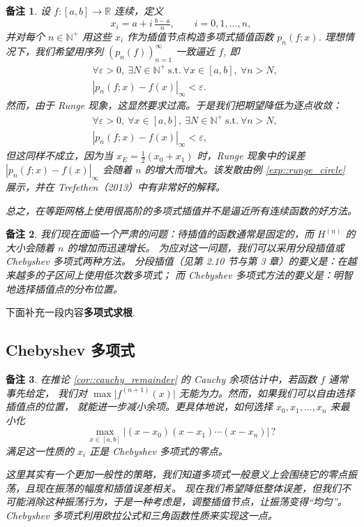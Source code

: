 \documentclass[a4paper]{ctexart}
\newtheorem{remark}{备注}
\numberwithin{theorem}{section}
\numberwithin{equation}{section}
\numberwithin{figure}{section}
\numberwithin{remark}{section}
\begin{document}
\begin{remark}
设 $f:[a,b]\to\mathbb{R}$ 连续，定义
\begin{equation*}
x_i=a+i\,\tfrac{b-a}{n},\qquad i=0,1,\ldots,n,
\end{equation*}
并对每个 $n\in\mathbb{N}^+$ 用这些 $x_i$ 作为插值节点构造多项式插值函数 $p_n(f;x)$. 
理想情况下，我们希望用序列 $(p_n(f))_{n=1}^{\infty}$ 一致逼近 $f$, 即
\begin{align*}
&\forall \varepsilon>0,\ \exists N\in\mathbb{N}^+\ \text{s.t.}\ \forall x\in[a,b],\ \forall n>N, \\
&| p_n(f;x)-f(x) |_{\infty}<\varepsilon.
\end{align*}
然而，由于 Runge 现象，这显然要求过高。于是我们把期望降低为逐点收敛：
\begin{align*}
&\forall \varepsilon>0,\ \forall x\in[a,b],\ \exists N\in\mathbb{N}^+\ \text{s.t.}\ \forall n>N, \\
& |p_n(f;x)-f(x)|_{\infty}<\varepsilon,
\end{align*}
但这同样不成立，因为当 $x_E=\tfrac{1}{2}(x_0+x_1)$ 时，Runge 现象中的误差 $| p_n(f;x)-f(x)|_{\infty} $ 
会随着 $n$ 的增大而增大。该发散由例 \ref{exp::runge_circle} 展示，并在 Trefethen（2013）中有非常好的解释。

总之，在等距网格上使用很高阶的多项式插值并不是逼近所有连续函数的好方法。
\end{remark}

\begin{remark}
我们现在面临一个严肃的问题：待插值的函数通常是固定的，而 $H^{(n)}$ 的大小会随着 $n$ 的增加而迅速增长。
为应对这一问题，我们可以采用分段插值或 Chebyshev 多项式两种方法。
分段插值（见第 2.10 节与第 3 章）的要义是：在越来越多的子区间上使用低次数多项式；
而 Chebyshev 多项式方法的要义是：明智地选择插值点的分布位置。
\end{remark}

下面补充一段内容\textbf{多项式求根}.


\subsection{Chebyshev 多项式}

\begin{remark}
在推论 \ref{cor::cauchy_remainder} 的 Cauchy 余项估计中，若函数 $f$ 通常事先给定，
我们对 $\max\lvert f^{(n+1)}(x)\rvert$ 无能为力。然而，如果我们可以自由选择插值点的位置，
就能进一步减小余项。更具体地说，如何选择 $x_0,x_1,\ldots,x_n$ 来最小化
\begin{equation*}
\max_{x\in[a,b]} \bigl\lvert (x-x_0)(x-x_1)\cdots(x-x_n) \bigr\rvert \, ?
\end{equation*}
满足这一性质的 $x_i$ 正是 Chebyshev 多项式的零点。

这里其实有一个更加一般性的策略，我们知道多项式一般意义上会围绕它的零点振荡，且现在振荡的幅度和插值误差相关。
现在我们希望降低整体误差，但我们不可能消除这种振荡行为，于是一种考虑是，调整插值节点，让振荡变得“均匀”。
Chebyshev 多项式利用欧拉公式和三角函数性质来实现这一点。
\end{remark}
\end{document}
